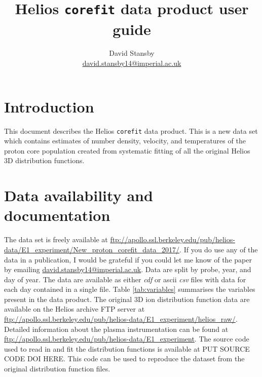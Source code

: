 \documentclass[11pt,a4paper]{article}
\begin{document}
\title{Helios \texttt{corefit} data product user guide}
\author{David Stansby \\
\href{mailto:david.stansby14@imperial.ac.uk}{david.stansby14@imperial.ac.uk}}
\maketitle

\section{Introduction}
This document describes the Helios \texttt{corefit} data product. This is a new data set which contains estimates of number density, velocity, and temperatures of the proton core population created from systematic fitting of all the original Helios 3D distribution functions.

\section{Data availability and documentation}
The data set is freely available at \url{ftp://apollo.ssl.berkeley.edu/pub/helios-data/E1_experiment/New_proton_corefit_data_2017/}. If you do use any of the data in a publication, I would be grateful if you could let me know of the paper by emailing \href{mailto:david.stansby14@imperial.ac.uk}{david.stansby14@imperial.ac.uk}.
\newline
\newline
Data are split by probe, year, and day of year. The data are available as either \emph{cdf} or ascii \emph{csv} files with data for each day contained in a single file. Table \ref{tab:variables} summarises the variables present in the data product.
\newline
\newline
The original 3D ion distribution function data are available on the Helios archive FTP server at \url{ftp://apollo.ssl.berkeley.edu/pub/helios-data/E1_experiment/helios_raw/}. Detailed information about the plasma instrumentation can be found at \url{ftp://apollo.ssl.berkeley.edu/pub/helios-data/E1_experiment}. The source code used to read in and fit the distribution functions is available at PUT SOURCE CODE DOI HERE. This code can be used to reproduce the dataset from the original distribution function files.
\end{document}

